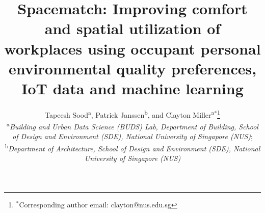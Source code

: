 \documentclass[]{interact}
\theoremstyle{plain}%
\theoremstyle{definition}
\theoremstyle{remark}
\begin{document}

\title{Spacematch: Improving comfort and spatial utilization of workplaces using occupant personal environmental quality preferences, IoT data and machine learning}

\author{Tapeesh Sood\textsuperscript{a},
Patrick Janssen\textsuperscript{b},
and Clayton Miller\textsuperscript{a}$^{\ast}$\thanks{$^\ast$Corresponding author email: clayton@nus.edu.sg}\\
\vspace{6pt}
\textsuperscript{a}{\em Building and Urban Data Science (BUDS) Lab, Department of Building, School of Design and Environment (SDE), National University of Singapore (NUS)};\\
\textsuperscript{b}{\em Department of Architecture, School of Design and Environment (SDE), National University of Singapore (NUS)}
}

\maketitle
\end{document}

